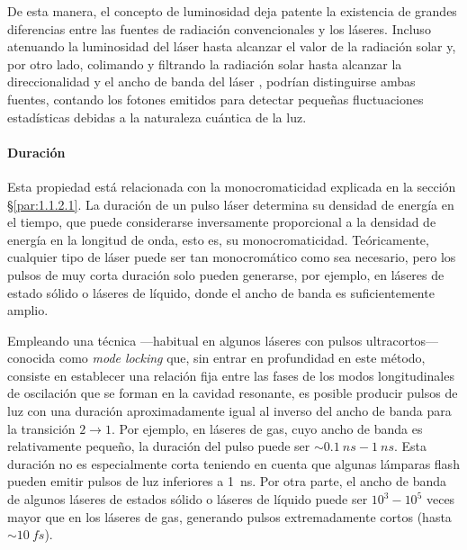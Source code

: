De esta manera, el concepto de luminosidad deja patente la existencia de grandes diferencias entre las fuentes de radiación convencionales y los láseres. Incluso atenuando la luminosidad del láser  hasta alcanzar el valor de la radiación solar y, por otro lado, colimando y filtrando la radiación solar hasta alcanzar la direccionalidad y el ancho de banda del láser , podrían distinguirse ambas fuentes, contando los fotones emitidos para detectar pequeñas fluctuaciones estadísticas debidas a la naturaleza cuántica de la luz. 

\paragraph{Duración}\label{par:1.1.2.5}
Esta propiedad está relacionada con la monocromaticidad explicada en la sección \S\ref{par:1.1.2.1}. La duración de un pulso láser determina su densidad de energía en el tiempo, que puede considerarse inversamente proporcional a la densidad de energía en la longitud de onda, esto es, su monocromaticidad\autocite{sveltoPrinciplesLasers2010}. Teóricamente, cualquier tipo de láser puede ser tan monocromático como sea necesario, pero los pulsos de muy corta duración solo pueden generarse, por ejemplo, en láseres de estado sólido o láseres de líquido, donde el ancho de banda es suficientemente amplio.

Empleando una técnica ---habitual en algunos láseres con pulsos ultracortos--- conocida como \emph{mode locking} que, sin entrar en profundidad en este método, consiste en establecer una relación fija entre las fases de los modos longitudinales de oscilación que se forman en la cavidad resonante, es posible producir pulsos de luz con una duración aproximadamente igual al inverso del ancho de banda para la transición $2 \rightarrow 1$. Por ejemplo, en láseres de gas, cuyo ancho de banda es relativamente pequeño, la duración del pulso puede ser $\sim\qty{0,1}{ns}-\qty{1}{ns}$. Esta duración no es especialmente corta teniendo en cuenta que algunas lámparas flash pueden emitir pulsos de luz inferiores a \qty{1}{ns}. Por otra parte, el ancho de banda de algunos láseres de estados sólido o láseres de líquido puede ser $10^3-10^5$ veces mayor que en los láseres de gas, generando pulsos extremadamente cortos (hasta $\sim\qty{10}{fs}$).

